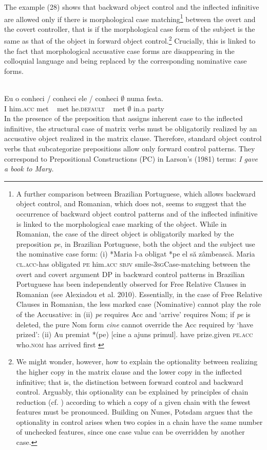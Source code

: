 \documentclass[output=paper]{langsci/langscibook}
\begin{document}
The example (28) shows that backward object control and the inflected infinitive are allowed only if there is morphological case matching\footnote{A further comparison between Brazilian Portuguese, which allows backward object control, and Romanian, which does not, seems to suggest that the occurrence of backward object control patterns and of the inflected infinitive is linked to the morphological case marking of the object. While in Romanian, the case of the direct object is obligatorily marked by the preposition \textit{pe}, in Brazilian Portuguese, both the object and the subject use the nominative case form: (i)  *Maria  l-a     obligat     *pe el            să      zâmbească.  Maria  \textsc{cl.acc}{}-has        obligated     \textsc{pe} him\textsc{.acc} \textsc{sbjv} smile\textsc{{}-3sg}Case-matching between the overt and covert argument DP in backward control patterns in Brazilian Portuguese has been independently observed for Free Relative Clauses in Romanian (see Alexiadou et al. 2010). Essentially, in the case of Free Relative Clauses in Romanian, the less marked case (Nominative) cannot play the role of the Accusative: in (ii) \textit{pe} requires Acc and ‘arrive’ requires Nom; if \textit{pe} is deleted, the pure Nom form \textit{cine} cannot override the Acc required by ‘have prized’: (ii)  Au    premiat       *(pe)     [cine        a     ajuns    primul].  have prize.given   \textsc{pe.acc}  who.\textsc{nom} has arrived first \citep{AlexiadouEtAl2010}} between the overt and the covert controller, that is if the morphological case form of the subject is the same as that of the object in forward object control.\footnote{We might wonder, however, how to explain the optionality between realizing the higher copy in the matrix clause and the lower copy in the inflected infinitive; that is, the distinction between forward control and backward control. Arguably, this optionality can be explained by principles of chain reduction (cf. \citealt{Nunes2004}) according to which a copy of a given chain with the fewest features must be pronounced. Building on Nunes, Potsdam argues that the optionality in control arises when two copies in a chain have the same number of unchecked features, since one case value can be overridden by another case.} Crucially, this is linked to the fact that morphological accusative case forms are disappearing in the colloquial language and being replaced by the corresponding nominative case forms.

\ea%
    \citep[328]{Farrell1990}\label{ex:moreno:29}\\
    \gll Eu  o       conheci \slash{} conheci ele        \slash{}  conheci {$\emptyset$} numa festa. \\
         I  him.\textsc{acc} met  ~  met  he.\textsc{default} ~ met   {$\emptyset$} in.a    party\\
\z
In the presence of the preposition that assigns inherent case to the inflected infinitive, the structural case of matrix verbs must be obligatorily realized by an accusative object realized in the matrix clause. Therefore, standard object control verbs that subcategorize prepositions allow only forward control patterns. They correspond to Prepositional Constructions (PC) in Larson’s (1981) terms: \textit{I gave a book to Mary.}
\end{document}
